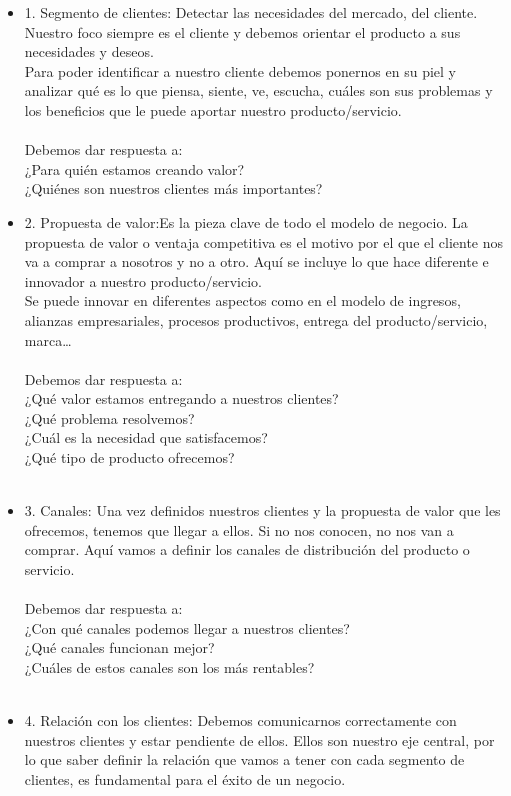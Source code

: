 \documentclass[%
 reprint,
 amsmath,amssymb,
 aps,
]{revtex4-1}
\begin{document}
\begin{itemize}
	\item 1. Segmento de clientes: Detectar las necesidades del mercado, del cliente. Nuestro foco siempre es el cliente y debemos orientar el producto a sus necesidades y deseos.\\
Para poder identificar a nuestro cliente debemos ponernos en su piel y analizar qué es lo que piensa, siente, ve, escucha, cuáles son sus problemas y los beneficios que le puede aportar nuestro producto/servicio.\\\\
Debemos dar respuesta a:\\
¿Para quién estamos creando valor?\\
¿Quiénes son nuestros clientes más importantes?
	\item 2. Propuesta de valor:Es la pieza clave de todo el modelo de negocio. La propuesta de valor o ventaja competitiva es el motivo por el que el cliente nos va a comprar a nosotros y no a otro. Aquí se incluye lo que hace diferente e innovador a nuestro producto/servicio.\\
Se puede innovar en diferentes aspectos como en el modelo de ingresos, alianzas empresariales, procesos productivos, entrega del producto/servicio, marca…\\\\
Debemos dar respuesta a:\\
¿Qué valor estamos entregando a nuestros clientes?\\
¿Qué problema resolvemos?\\
¿Cuál es la necesidad que satisfacemos?\\
¿Qué tipo de producto ofrecemos?\\\\
	\item 3. Canales: Una vez definidos nuestros clientes y la propuesta de valor que les ofrecemos, tenemos que llegar a ellos. Si no nos conocen, no nos van a comprar. Aquí vamos a definir los canales de distribución del producto o servicio.\\\\
Debemos dar respuesta a:\\
¿Con qué canales podemos llegar a nuestros clientes?\\
¿Qué canales funcionan mejor?\\
¿Cuáles de estos canales son los más rentables?\\\\
	\item 4. Relación con los clientes: Debemos comunicarnos correctamente con nuestros clientes y estar pendiente de ellos. Ellos son nuestro eje central, por lo que saber definir la relación que vamos a tener con cada segmento de clientes, es fundamental para el éxito de un negocio.\\\\

\end{itemize}
\end{document}
